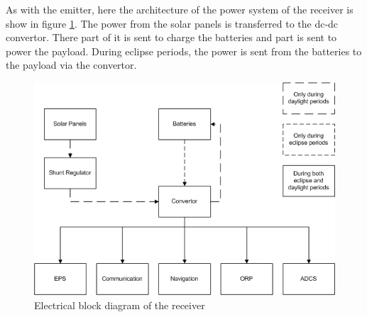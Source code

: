 As with the emitter, here the architecture of the power system of the receiver is show in figure \ref{fig:receiver_block}. The power from the solar panels is transferred to the dc-dc convertor. There part of it is sent to charge the batteries and part is sent to power the payload. During eclipse periods, the power is sent from the batteries to the payload via the convertor.

\begin{figure}[H!]
\centering
\includegraphics{img/EPS receiver block diagram.png}
\caption{Electrical block diagram of the receiver}
\label{fig:receiver_block}
\end{figure}